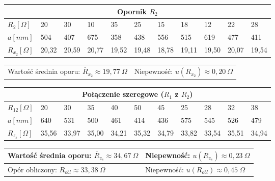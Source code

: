 \documentclass[a4paper,11pt]{article}
\begin{document}
\begin{table}[!ht]
\setlength{\extrarowheight}{5pt}
\centering
\begin{tabularx}{\textwidth}{XXXXXXXXXXX}

\multicolumn{11}{c}{\textbf{Opornik $R_2$}}\\        
\hline
$R_2[\Omega]$  &20	&30	&10	&35	&25	&15	&18	&12	&22	&28   \\
\hline
$a[mm]$  & 504 & 407 & 675 & 358 & 438 & 556 & 515 & 619	& 477 & 411 \\
\hline
$R_{x_2}[\Omega]$ &20,32 &20,59 &20,77 &19,52 &19,48 &18,78	&19,11	&19,50	&20,07	&19,54
\\    
\hline   
\end{tabularx}
\begin{tabularx}{\textwidth}{XX}
\centering
Wartość średnia oporu: $\overline{R}_{x_2}\approx 19,77~\Omega $ & Niepewność: $u(R_{x_2})\approx 0,20 ~\Omega $\\

\end{tabularx}
\end{table}


         
\begin{table}[!ht]
\setlength{\extrarowheight}{5pt}
\centering
\begin{tabularx}{\textwidth}{XXXXXXXXXXX}

\multicolumn{11}{c}{\textbf{Połączenie szeregowe ($R_1$ z $R_2$)}}\\        
\hline
$R_{12}[\Omega]$  & 20	&30	&35	&40	&50	&45	&25	&28	&32	&38 \\
\hline
$a[mm]$  & 640	&531 &500 &461 &414 &436 &575 &545 &526	&479 \\
\hline
$R_{z_s}[\Omega]$ & 35,56 & 33,97 & 35,00 & 34,21 & 35,32 & 34,79 & 33,82 & 33,54 & 35,51 & 34,94
\\    
\hline   
\end{tabularx}
\begin{tabularx}{\textwidth}{XX}
\centering
Wartość średnia oporu: $\overline{R}_{z_s}\approx 34,67~\Omega$ & Niepewność: $u(R_{z_s})\approx 0,23~\Omega$ \\ \hline
\centering
Opór obliczony: $R_{obl} \approx 33,38~\Omega$ & Niepewność: $u(R_{obl})\approx 0,45~\Omega$\\
\end{tabularx}
\end{table}
\end{document}

